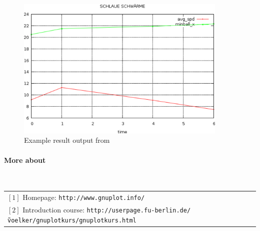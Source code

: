 \begin{figure}[p]
	\begin{center}
	\includegraphics[width=0.9\textwidth]{stats-howto-gnuplot.png}
	\caption{Example result output from \gnuplot}
	\end{center}
\end{figure}


\paragraph{More about \gnuplot}~\\

\begin{tabular}{l}
 $[1]$ Homepage: \texttt{\scriptsize http://www.gnuplot.info/} \\
 $[2]$ Introduction course: \texttt{\scriptsize http://userpage.fu-berlin.de/\~voelker/gnuplotkurs/gnuplotkurs.html}
\end{tabular}